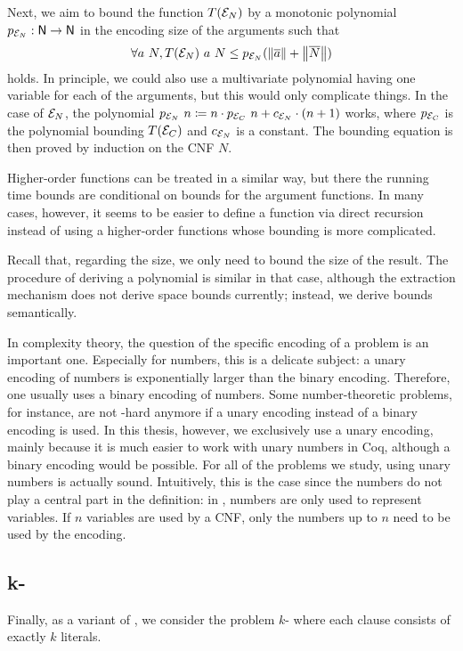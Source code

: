   Next, we aim to bound the function $T(\mathcal{E}_N)$ by a monotonic polynomial $p_{\mathcal{E}_N} : \mathsf{N} \rightarrow \mathsf{N}$ in the encoding size of the arguments such that 
  \[\forall a~N, T(\mathcal{E}_N)~a~N \le p_{\mathcal{E}_N}(\left\lVert\overline{a}\right\rVert + \left\lVert\overline{N}\right\rVert) \]
  holds. In principle, we could also use a multivariate polynomial having one variable for each of the arguments, but this would only complicate things. 
  In the case of $\mathcal{E}_N$, the polynomial $p_{\mathcal{E}_N}~n \coloneqq n \cdot p_{\mathcal{E}_C}~n + c_{\mathcal{E}_N} \cdot (n +1)$ works, where $p_{\mathcal{E}_C}$ is the polynomial bounding $T(\mathcal{E}_C)$ and $c_{\mathcal{E}_N}$ is a constant. The bounding equation is then proved by induction on the CNF $N$. 

  Higher-order functions can be treated in a similar way, but there the running time bounds are conditional on bounds for the argument functions. In many cases, however, it seems to be easier to define a function via direct recursion instead of using a higher-order functions whose bounding is more complicated.

  Recall that, regarding the size, we only need to bound the size of the result. The procedure of deriving a polynomial is similar in that case, although the extraction mechanism does not derive space bounds currently; instead, we derive bounds semantically.

  \begin{remark}
    In complexity theory, the question of the specific encoding of a problem is an important one. Especially for numbers, this is a delicate subject: a unary encoding of numbers is exponentially larger than the binary encoding. Therefore, one usually uses a binary encoding of numbers. Some number-theoretic problems, for instance, are not \NP{}-hard anymore if a unary encoding instead of a binary encoding is used.
    In this thesis, however, we exclusively use a unary encoding, mainly because it is much easier to work with unary numbers in Coq, although a binary encoding would be possible. 
    For all of the problems we study, using unary numbers is actually sound. Intuitively, this is the case since the numbers do not play a central part in the definition: in \SAT{}, numbers are only used to represent variables. If $n$ variables are used by a CNF, only the numbers up to $n$ need to be used by the encoding.
  \end{remark}

\newcommand{\kCNF}[1]{\text{$#1$-\textsf{CNF}}}
\subsection{k-\SAT{}}
Finally, as a variant of \SAT{}, we consider the problem $k$-\SAT{} where each clause consists of exactly $k$ literals. 


